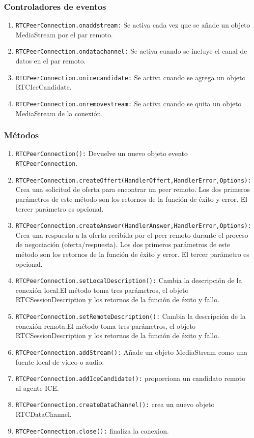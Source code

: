 \subsubsection*{Controladores de eventos}
\begin{enumerate}
  \item \texttt{RTCPeerConnection.onaddstream:} Se activa cada vez que se añade un objeto MediaStream por el par remoto.
  \item \texttt{RTCPeerConnection.ondatachannel:} Se activa cuando se incluye el canal de datos en el par remoto.
  \item \texttt{RTCPeerConnection.onicecandidate:} Se activa cuando se agrega un objeto RTCIceCandidate.
  \item \texttt{RTCPeerConnection.onremovestream:} Se activa cuando se quita un objeto MediaStream de la conexión.
\end{enumerate}
\subsubsection*{Métodos}
\begin{enumerate}
  \item \texttt{RTCPeerConnection():} Devuelve un nuevo objeto evento \texttt{RTCPeerConnection}.
  \item \texttt{RTCPeerConnection.createOffert(HandlerOffert,HandlerError,Options):} Crea una solicitud de oferta para encontrar un peer remoto. Los dos primeros parámetros de este método son los retornos de la función de éxito y error. El tercer parámetro es opcional.
  \item \texttt{RTCPeerConnection.createAnswer(HandlerAnswer,HandlerError,Options):} Crea una respuesta a la oferta recibida por el peer remoto durante el proceso de negociación (oferta/respuesta). Los dos primeros parámetros de este método son los retornos de la función de éxito y error. El tercer parámetro es opcional.
  \item \texttt{RTCPeerConnection.setLocalDescription():} Cambia la descripción de la conexión local.El método toma tres parámetros, el objeto RTCSessionDescription y los retornos de la función de éxito y fallo.
  \item \texttt{RTCPeerConnection.setRemoteDescription():} Cambia la descripción de la conexión remota.El método toma tres parámetros, el objeto RTCSessionDescription y los retornos de la función de éxito y fallo.
  \item \texttt{RTCPeerConnection.addStream():} Añade un objeto MediaStream como una fuente local de vídeo o audio.
  \item \texttt{RTCPeerConnection.addIceCandidate():} proporciona un candidato remoto al agente ICE.
  \item \texttt{RTCPeerConnection.createDataChannel():} crea un nuevo objeto RTCDataChannel.
  \item \texttt{RTCPeerConnection.close():} finaliza la conexion.
\end{enumerate}
